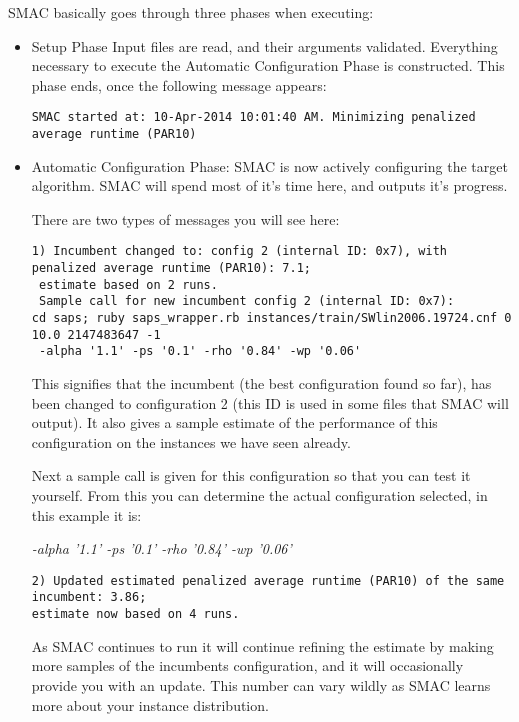 \documentclass[manual.tex]{subfiles}
\begin{document}
SMAC basically goes through three phases when executing:
\begin{itemize}
\item Setup Phase Input files are read, and their arguments validated. Everything necessary to execute the Automatic Configuration Phase is constructed. This phase ends, once the following message appears:
\scriptsize{
\begin{verbatim}
SMAC started at: 10-Apr-2014 10:01:40 AM. Minimizing penalized average runtime (PAR10)
\end{verbatim}
}
\normalsize 
\item Automatic Configuration Phase: SMAC is now actively configuring the target algorithm. SMAC will spend most of it's time here, and outputs it's progress. 

There are two types of messages you will see here:


\scriptsize{
\begin{verbatim}
1) Incumbent changed to: config 2 (internal ID: 0x7), with penalized average runtime (PAR10): 7.1;
 estimate based on 2 runs.
 Sample call for new incumbent config 2 (internal ID: 0x7): 
cd saps; ruby saps_wrapper.rb instances/train/SWlin2006.19724.cnf 0 10.0 2147483647 -1
 -alpha '1.1' -ps '0.1' -rho '0.84' -wp '0.06'  

\end{verbatim}
}
\normalsize

This signifies that the incumbent (the best configuration found so far), has been changed to configuration 2 (this ID is used in some files that SMAC will output). It also gives a sample estimate of the performance of this configuration on the instances we have seen already.

Next a sample call is given for this configuration so that you can test it yourself. From this you can determine the actual configuration selected, in this example it is:

\begin{center}
\emph{-alpha '1.1' -ps '0.1' -rho '0.84' -wp '0.06'}
\end{center}


\scriptsize{
\begin{verbatim}
2) Updated estimated penalized average runtime (PAR10) of the same incumbent: 3.86;
estimate now based on 4 runs.
\end{verbatim}
}
\normalsize

As SMAC continues to run it will continue refining the estimate by making more samples of the incumbents configuration, and it will occasionally provide you with an update. This number can vary wildly as SMAC learns more about your instance distribution.




\end{itemize}
\end{document}
